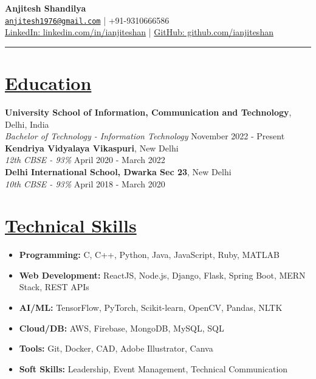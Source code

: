 \documentclass[a4paper,10pt]{article}
\begin{document}
\begin{center}
    {\LARGE \textbf{Anjitesh Shandilya}}\\
    \vspace{2mm}
    \href{mailto:anjitesh1976@gmail.com}{\texttt{anjitesh1976@gmail.com}} | +91-9310666586\\
    \href{https://linkedin.com/in/ianjiteshan}{LinkedIn: linkedin.com/in/ianjiteshan} | \href{https://github.com/ianjiteshan}{GitHub: github.com/ianjiteshan}\\
\end{center}

\hrule
\vspace{3mm}

\section*{\underline{Education}}
\textbf{University School of Information, Communication and Technology}, Delhi, India\\
\textit{Bachelor of Technology - Information Technology} \hfill November 2022 - Present\\

\textbf{Kendriya Vidyalaya Vikaspuri}, New Delhi\\
\textit{12th CBSE - 93\%} \hfill April 2020 - March 2022\\

\textbf{Delhi International School, Dwarka Sec 23}, New Delhi\\
\textit{10th CBSE - 93\%} \hfill April 2018 - March 2020\\  %

\section*{\underline{Technical Skills}}
\begin{itemize}[leftmargin=*]
    \item \textbf{Programming:} C, C++, Python, Java, JavaScript, Ruby, MATLAB
    \item \textbf{Web Development:} ReactJS, Node.js, Django, Flask, Spring Boot, MERN Stack, REST APIs
    \item \textbf{AI/ML:} TensorFlow, PyTorch, Scikit-learn, OpenCV, Pandas, NLTK
    \item \textbf{Cloud/DB:} AWS, Firebase, MongoDB, MySQL, SQL
    \item \textbf{Tools:} Git, Docker, CAD, Adobe Illustrator, Canva
    \item \textbf{Soft Skills:} Leadership, Event Management, Technical Communication
\end{itemize}
\end{document}
